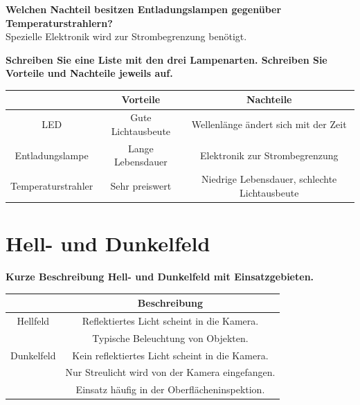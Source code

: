\documentclass[a4paper]{article}
\begin{document}
	\textbf{Welchen Nachteil besitzen Entladungslampen gegenüber Temperaturstrahlern?}\\
	Spezielle Elektronik wird zur Strombegrenzung benötigt.\\
	
	\newpage
	
	\textbf{Schreiben Sie eine Liste mit den drei Lampenarten. Schreiben Sie Vorteile und Nachteile jeweils auf.}\\
	\begin{center}
		\begin{tabular}{ c|c|c }
			& Vorteile & Nachteile \\ 
			\hline
			LED & Gute Lichtausbeute & Wellenlänge ändert sich mit der Zeit \\
			Entladungslampe & Lange Lebensdauer & Elektronik zur Strombegrenzung \\
			Temperaturstrahler & Sehr preiswert & Niedrige Lebensdauer, schlechte Lichtausbeute \\
		\end{tabular}
	\end{center}
	\vspace{10pt}
	
	\section{Hell- und Dunkelfeld}
	\textbf{Kurze Beschreibung Hell- und Dunkelfeld mit Einsatzgebieten.}\\
	\begin{center}
		\begin{tabular}{ c|c }
			 & Beschreibung \\ 
			\hline
			Hellfeld & Reflektiertes Licht scheint in die Kamera. \\
			& Typische Beleuchtung von Objekten.\\
			\hline
			Dunkelfeld & Kein reflektiertes Licht scheint in die Kamera.\\
			& Nur Streulicht wird von der Kamera eingefangen.\\
			& Einsatz häufig in der Oberflächeninspektion.\\
		\end{tabular}
	\end{center}
	\vspace{10pt}
	
\end{document}
